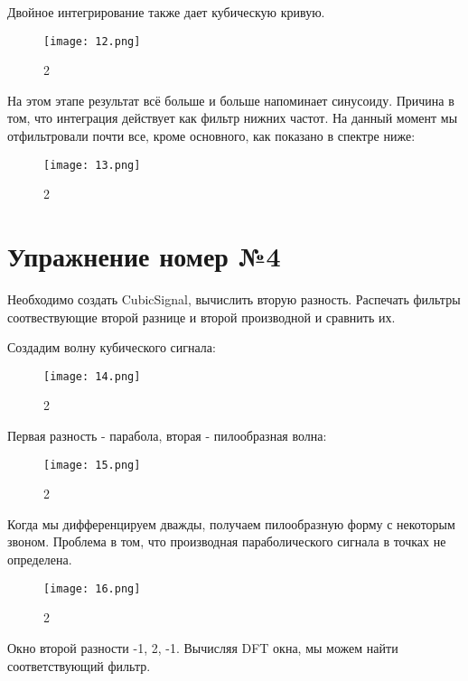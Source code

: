 \documentclass[10pt,a4paper,oneside]{article}
\begin{document}
Двойное интегрирование также дает кубическую кривую.

\begin{figure}[H]
        \centering
        \texttt{[image: 12.png]}
        \caption{2}
        \label{fig:first}
\end{figure}

На этом этапе результат всё больше и больше напоминает синусоиду. Причина в том, что интеграция действует как фильтр нижних частот. На данный момент мы отфильтровали почти все, кроме основного, как показано в спектре ниже:

\begin{figure}[H]
        \centering
        \texttt{[image: 13.png]}
        \caption{2}
        \label{fig:first}
\end{figure}

\section{Упражнение номер №4}

Необходимо создать CubicSignal, вычислить вторую разность. Распечать фильтры соотвествующие второй разнице и второй производной и сравнить их.

Создадим волну кубического сигнала:

\begin{figure}[H]
        \centering
        \texttt{[image: 14.png]}
        \caption{2}
        \label{fig:first}
\end{figure}

Первая разность - парабола, вторая - пилообразная волна:

\begin{figure}[H]
        \centering
        \texttt{[image: 15.png]}
        \caption{2}
        \label{fig:first}
\end{figure}

Когда мы дифференцируем дважды, получаем пилообразную форму с некоторым звоном. Проблема в том, что производная параболического сигнала в точках не определена.

\begin{figure}[H]
        \centering
        \texttt{[image: 16.png]}
        \caption{2}
        \label{fig:first}
\end{figure}

Окно второй разности -1, 2, -1. Вычисляя DFT окна, мы можем найти соответствующий фильтр.
\end{document}

